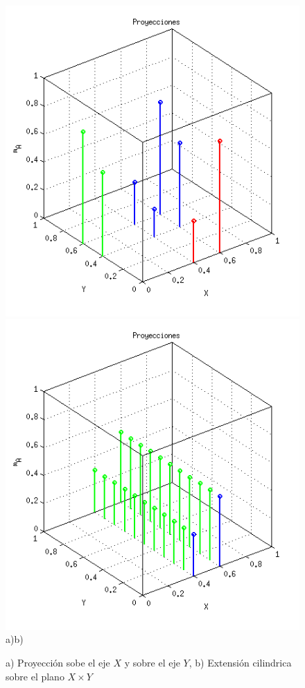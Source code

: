 \documentclass[10pt,onecolumn,twoside,letterpaper]{article}
\begin{document}
\begin{figure}[H]
 \centering
 \includegraphics[scale=0.6]{ProjA.png}
 \includegraphics[scale=0.6]{ExtA.png}\\
 a)\hspace{7.5cm}b)
 \caption{a) Proyecci\'on sobe el eje $X$ y sobre el eje $Y$, b) Extensi\'on cilindrica sobre el plano $X\times Y$}
 \label{fig:ProyA}
\end{figure}
\end{document}
